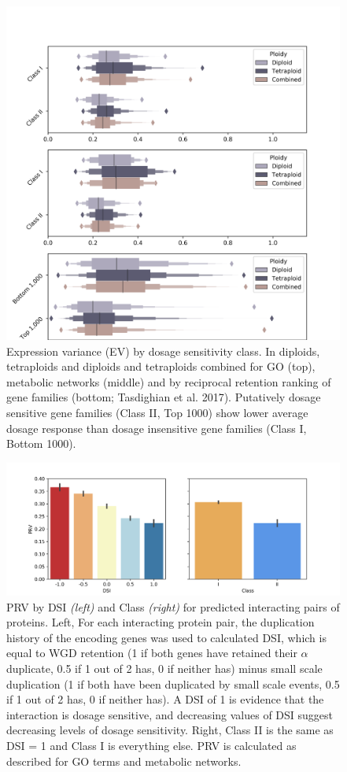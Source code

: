 \documentclass[11pt]{article}
\begin{document}
{\begin{figure}[h!]
   \includegraphics[width=\linewidth]{../figures/EV_boxen.png}
\caption{Expression variance (EV) by dosage sensitivity class. In diploids, tetraploids and diploids and tetraploids combined for GO (top), metabolic networks (middle) and by reciprocal retention ranking of gene families (bottom; Tasdighian et al. 2017). Putatively dosage sensitive gene families (Class II, Top 1000) show lower average dosage response than dosage insensitive gene families (Class I, Bottom 1000).}
 \label{fig5}
\end{figure}


\begin{figure}[h!]
   \includegraphics[width=\linewidth]{../figures/sppi.png}
\caption{PRV by DSI \textit{(left)} and Class \textit{(right)} for predicted interacting pairs of proteins. Left, For each interacting protein pair, the duplication history of the encoding genes was used to calculated DSI, which is equal to WGD retention (1 if both genes have retained their $\alpha$ duplicate, 0.5 if 1 out of 2 has, 0 if neither has) minus small scale duplication (1 if both have been duplicated by small scale events, 0.5 if 1 out of 2 has, 0 if neither has). A DSI of 1 is evidence that the interaction is dosage sensitive, and decreasing values of DSI suggest decreasing levels of dosage sensitivity. Right, Class II is the same as DSI = 1 and Class I is everything else. PRV is calculated as described for GO terms and metabolic networks.
}
 \label{fig6}
\end{figure}
}
\end{document}
